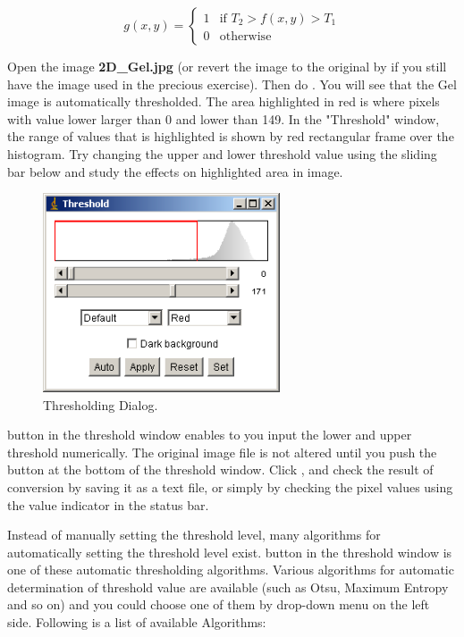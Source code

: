\begin{equation}
g(x,y)= 
\begin{cases}
1 & \text{if $T_2 > f(x, y) > T_1$}\\
0 & \text{otherwise}
\end{cases}
\end{equation}

\begin{indentexercise}{2}
Open the image \textbf{2D\_Gel.jpg} (or
revert the image to the original by  if you still have the image used in the precious exercise).
Then do . 
You will see that the Gel image is automatically
thresholded. The area highlighted in red is where pixels with value
lower larger than 0 and lower than 149. In the
"Threshold" window, the range of values that is highlighted is shown by red rectangular frame over the
histogram. Try changing the upper and lower threshold value using the
sliding bar below and study the effects on highlighted area in image. 

\begin{figure}[htbp]
\begin{center}
\includegraphics[width=7cm]{img/CMCIBasicCourse201102-img107.png}
\caption{ Thresholding Dialog.}
\label{fig:img107}
\end{center}
\end{figure}

 button in the threshold
window enables to you input the lower and upper threshold numerically.
The original image file is not altered until you push the button
 at the bottom of the
threshold window. Click , and
check the result of conversion by saving it as a text file, or simply
by checking the pixel values using the value indicator in the status
bar. 
\end{indentexercise}

Instead of manually setting the threshold level, many algorithms for
automatically setting the threshold level exist.
 button in the threshold
window is one of these automatic thresholding algorithms. Various
algorithms for automatic determination of threshold value are available
(such as Otsu, Maximum Entropy and so on) and you could choose one of
them by drop-down menu on the left side. Following is a list of
available Algorithms:


